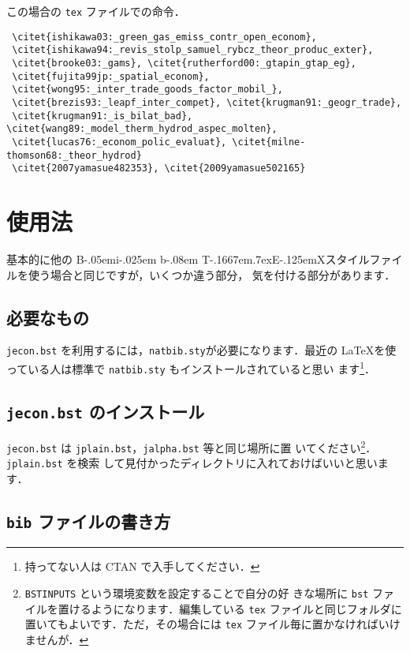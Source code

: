 \documentclass[a4j,10pt]{jarticle}
\def\BibTeX{{\rm B\kern-.05em{\sc i\kern-.025em b}\kern-.08em
    T\kern-.1667em\lower.7ex\hbox{E}\kern-.125emX}}
\begin{document}
この場合の \texttt{tex} ファイルでの命令．

\begin{screen}
\begin{verbatim}
 \citet{ishikawa03:_green_gas_emiss_contr_open_econom},
 \citet{ishikawa94:_revis_stolp_samuel_rybcz_theor_produc_exter},
 \citet{brooke03:_gams}, \citet{rutherford00:_gtapin_gtap_eg},
 \citet{fujita99jp:_spatial_econom},
 \citet{wong95:_inter_trade_goods_factor_mobil_},
 \citet{brezis93:_leapf_inter_compet}, \citet{krugman91:_geogr_trade},
 \citet{krugman91:_is_bilat_bad}, \citet{wang89:_model_therm_hydrod_aspec_molten},
 \citet{lucas76:_econom_polic_evaluat}, \citet{milne-thomson68:_theor_hydrod}
 \citet{2007yamasue482353}, \citet{2009yamasue502165} 
\end{verbatim}
\end{screen}


\section{使用法}

基本的に他の \BibTeX スタイルファイルを使う場合と同じですが，いくつか違う部分，
気を付ける部分があります．

\subsection{必要なもの}

\texttt{jecon.bst} を利用するには，\texttt{natbib.sty}が必要になります．最近の
\LaTeX を使っている人は標準で \texttt{natbib.sty} もインストールされていると思い
ます\footnote{持ってない人は CTAN で入手してください．}．


\subsection{\texttt{jecon.bst} のインストール}

\texttt{jecon.bst} は \texttt{jplain.bst}，\texttt{jalpha.bst} 等と同じ場所に置
いてください\footnote{\texttt{BSTINPUTS} という環境変数を設定することで自分の好
きな場所に \texttt{bst} ファイルを置けるようになります．編集している
\texttt{tex} ファイルと同じフォルダに置いてもよいです．ただ，その場合には
\texttt{tex} ファイル毎に置かなければいけませんが．}．\texttt{jplain.bst} を検索
して見付かったディレクトリに入れておけばいいと思います．

\subsection{\texttt{bib} ファイルの書き方}
\end{document}
